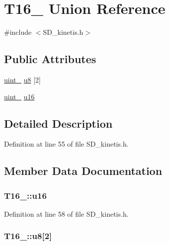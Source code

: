 \hypertarget{union_t16__8}{}\section{T16\+\_ Union Reference}
\label{union_t16__8}


{\ttfamily \#include $<$S\+D\+\_\+kinetis.\+h$>$}

\subsection*{Public Attributes}
\begin{DoxyCompactItemize}
\item 
\hyperlink{types_8h_ad3209046c23f739a81581c10a4be7d92}{uint\+\_} \hyperlink{union_t16__8_a950647f957c508ad305852823cddc9fe}{u8} \mbox{[}2\mbox{]}
\item 
\hyperlink{types_8h_a8ab774e38493b7c7e4d8edfd5004e66b}{uint\+\_} \hyperlink{union_t16__8_af0f6dbfe96e3fd52ec28ecce957a105d}{u16}
\end{DoxyCompactItemize}


\subsection{Detailed Description}


Definition at line 55 of file S\+D\+\_\+kinetis.\+h.



\subsection{Member Data Documentation}
\subsubsection[{\texorpdfstring{u16}{u16}}]{ T16\+\_\+::u16}\hypertarget{union_t16__8_af0f6dbfe96e3fd52ec28ecce957a105d}{}\label{union_t16__8_af0f6dbfe96e3fd52ec28ecce957a105d}


Definition at line 58 of file S\+D\+\_\+kinetis.\+h.

\subsubsection[{\texorpdfstring{u8}{u8}}]{ T16\+\_\+::u8\mbox{[}2\mbox{]}}\hypertarget{union_t16__8_a950647f957c508ad305852823cddc9fe}{}\label{union_t16__8_a950647f957c508ad305852823cddc9fe}


